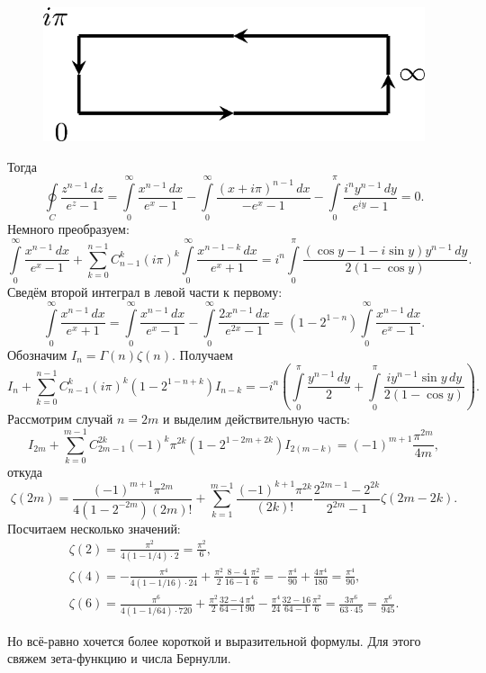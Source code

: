 \begin{figure}[h]
    \center
    \includegraphics[width=.5\textwidth]{2015-12-13-riemann-zeta-contour.png}
\end{figure}

Тогда
\[
    \oint\limits_C \frac{z^{n-1}\,dz}{e^z-1} = \int\limits_0^\infty \frac{x^{n-1}\,dx}{e^x - 1}  - \int\limits_0^\infty \frac{(x+i\pi)^{n-1}\,dx}{-e^x - 1} - \int\limits_0^\pi \frac{i^ny^{n-1}\,dy}{e^{iy} - 1} = 0.
\]
Немного преобразуем:
\[
    \int\limits_0^\infty \frac{x^{n-1}\,dx}{e^x - 1}  + \sum\limits_{k=0}^{n-1}C_{n-1}^k(i\pi)^k\int\limits_0^\infty \frac{x^{n-1-k}\,dx}{e^x + 1} = i^n\int\limits_0^\pi \frac{(\cos y - 1 - i\sin y) y^{n-1}\,dy}{2(1-\cos y)}.
\]
Сведём второй интеграл в левой части к первому:
\[
    \int\limits_0^\infty \frac{x^{n-1}\,dx}{e^x + 1} =
    \int\limits_0^\infty \frac{x^{n-1}\,dx}{e^{x} - 1} -
    \int\limits_0^\infty \frac{2x^{n-1}\,dx}{e^{2x} - 1}=
    (1-2^{1-n})\int\limits_0^\infty \frac{x^{n-1}\,dx}{e^{x} - 1}.
\]
Обозначим \( I_n = \Gamma(n)\zeta(n) \). Получаем
\[
    I_n  + \sum\limits_{k=0}^{n-1}C_{n-1}^k(i\pi)^k(1-2^{1-n+k})I_{n-k} = -i^n\left(\int\limits_0^\pi \frac{y^{n-1}\,dy}{2} + \int\limits_0^\pi \frac{i y^{n-1}\sin y\,dy}{2(1-\cos y)}\right).
\]
Рассмотрим случай \( n = 2m \) и выделим действительную часть:
\[
    I_{2m}  + \sum\limits_{k=0}^{m-1}C_{2m-1}^{2k}(-1)^k\pi^{2k}(1-2^{1-2m+2k})I_{2(m-k)} = (-1)^{m+1}\frac{\pi^{2m}}{4m},
\]
откуда
\[
    \zeta(2m)  = \frac{(-1)^{m+1}\pi^{2m}}{4(1-2^{-2m})(2m)!} + \sum\limits_{k=1}^{m-1}\frac{(-1)^{k+1}\pi^{2k}}{(2k)!}\frac{2^{2m-1}-2^{2k}}{2^{2m}-1}\zeta(2m-2k).
\]
Посчитаем несколько значений:
\[
\begin{array}{l}
\zeta(2) = \frac{\pi^2}{4(1-1/4)\cdot 2} = \frac{\pi^2}{6},\\
\zeta(4) = -\frac{\pi^4}{4(1-1/16)\cdot 24}+\frac{\pi^2}{2}\frac{8-4}{16-1}\frac{\pi^2}{6}= -\frac{\pi^4}{90}+\frac{4\pi^4}{180}=\frac{\pi^4}{90},\\
\zeta(6) = \frac{\pi^6}{4(1-1/64)\cdot 720}+\frac{\pi^2}{2}\frac{32-4}{64-1}\frac{\pi^4}{90} - \frac{\pi^4}{24}\frac{32-16}{64-1}\frac{\pi^2}{6}= \frac{3\pi^6}{63\cdot 45} = \frac{\pi^6}{945}.
\end{array}
\]

Но всё-равно хочется более короткой и выразительной формулы. Для этого свяжем зета-функцию и числа Бернулли.

